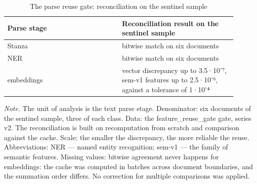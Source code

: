 \begin{table}[htbp]
\centering
\small
\caption{The parse reuse gate: reconciliation on the sentinel sample}
\label{tab:s13}
\begin{tabular}{>{\raggedright\arraybackslash}p{0.460\linewidth}>{\raggedright\arraybackslash}p{0.460\linewidth}}
\toprule
Parse stage & Reconciliation result on the sentinel sample \\
\midrule
Stanza & bitwise match on six documents \\
NER & bitwise match on six documents \\
embeddings & vector discrepancy up to 3.5·10⁻⁷, sem-v1 features up to 2.5·10⁻⁶, against a tolerance of 1·10⁻⁴ \\
\bottomrule
\end{tabular}
\begin{minipage}{\linewidth}\footnotesize\vspace{2pt}
\textit{Note.} The unit of analysis is the text parse stage. Denominator: six documents of the sentinel sample, three of each class. Data: the feature\_reuse\_gate gate, series v2. The reconciliation is built on recomputation from scratch and comparison against the cache. Scale: the smaller the discrepancy, the more reliable the reuse. Abbreviations: NER — named entity recognition; sem-v1 — the family of semantic features. Missing values: bitwise agreement never happens for embeddings: the cache was computed in batches across document boundaries, and the summation order differs. No correction for multiple comparisons was applied.
\end{minipage}
\end{table}
